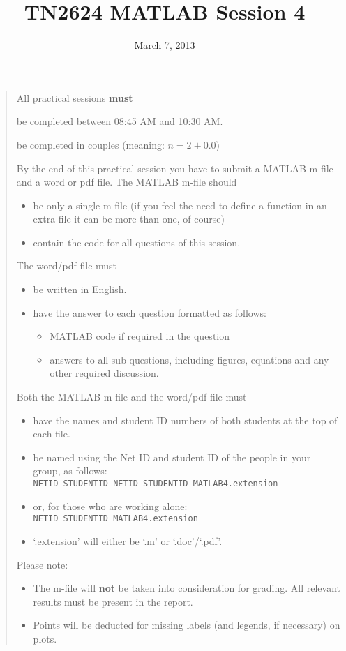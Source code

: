 \documentclass[11pt]{article}
\begin{document}
\title{TN2624 MATLAB Session 4}
\date{March 7, 2013}
\maketitle
\begin{quote} 
All practical sessions \textbf{must}
\begin{itemize}
{\color{red}\item be completed between 08:45 AM and 10:30 AM.}
\item be completed in couples (meaning: $n = 2 \pm 0.0$)
\end{itemize}
By the end of this practical session you have to submit a MATLAB m-file and a word or pdf file. The MATLAB m-file should
\begin{itemize}
\item be only a single m-file (if you feel the need to define a function in an extra file it can be more than one, of course)
\item contain the code for all questions of this session.
\end{itemize}
The word/pdf file must
\begin{itemize}
\item be written in English.
\item have the answer to each question formatted as follows: 
	\begin{itemize}
	\item MATLAB code if required in the question
	\item answers to all sub-questions, including figures, equations and any other required discussion.
	\end{itemize}
\end{itemize}
Both the MATLAB m-file and the word/pdf file must
\begin{itemize}
\item have the names and student ID numbers of both students at the top of each file.
\item be named using the Net ID and student ID of the people in your group, as follows:\\
	\verb|NETID_STUDENTID_NETID_STUDENTID_MATLAB4.extension|
\item or, for those who are working alone:\\
	\verb|NETID_STUDENTID_MATLAB4.extension|
\item ‘.extension’ will either be ‘.m’ or ‘.doc’/‘.pdf’.
\end{itemize}
{\color{red}
Please note:
\begin{itemize}
\item The m-file will \textbf{not} be taken into consideration for grading. All relevant results must be present in the report.
\item Points will be deducted for missing labels (and legends, if necessary) on plots.
\end{itemize}
}
\end{quote}
\end{document}

